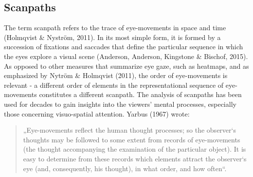 \documentclass[a4paper, 11pt]{scrreprt}
\begin{document}
\subsection{Scanpaths}
The term scanpath refers to the trace of eye-movements in space and time (Holmqvist \& Nyström, 2011). In its most simple form, it is formed by a succession of fixations and saccades that define the particular sequence in which the eyes explore a visual scene (Anderson, Anderson, Kingstone \& Bischof, 2015). As opposed to other measures that summarize eye gaze, such as heatmaps, and as  emphasized by Nytröm \& Holmqvist (2011), the order of eye-movements is relevant - a different order of elements in the representational sequence of eye-movements constitutes a different scanpath. \newline
The analysis of scanpaths has been used for decades to gain insights into the viewers’ mental processes, especially those concerning visuo-spatial attention. Yarbus (1967) wrote: 

\begin{quotation}
\footnotesize{„Eye-movements reflect the human thought processes; so the observer‘s thoughts may be followed to some extent from records of eye-movements (the thought accompanying the examination of the particular object). It is easy to determine from these records which elements attract the observer‘s eye (and, consequently, his thought), in what order, and how often“.}
\end{quotation}
\end{document}
